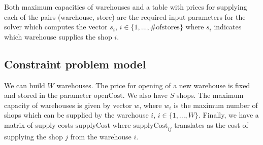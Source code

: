 Both maximum capacities of warehouses and a table with
prices for supplying each of the pairs (warehouse, store) are the required input parameters for the solver which computes the vector
 $s_i$, $i \in \{1,...,\#\mathrm{ of stores}\}$ where $s_i$ indicates which warehouse
 supplies the shop $i$.

\subsection{Constraint problem model}
We can build $W$ warehouses. The price for opening of a new warehouse is fixed and 
stored in the parameter $\mathrm{openCost}$. We also have $S$ shops. The maximum capacity
of warehouses is given by vector $w$, where $w_i$ is the maximum number of shops which
can be supplied by the warehouse $i$, $i \in \{1,...,W\}$.
Finally, we have a matrix of supply costs $\mathrm{supplyCost}$ where $\mathrm{supplyCost}_{ij}$ 
translates as the cost of supplying the shop $j$ from the warehouse $i$.

